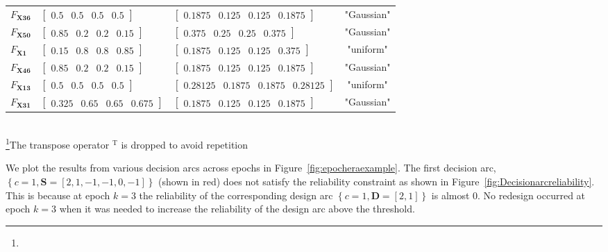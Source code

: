 \begin{table}[h!]
\begin{tabular}{l>{\centering\arraybackslash}p{4.2cm}>{\centering\arraybackslash}p{6cm}c}
	\hline
	$F_{\mathbf{X36}}$ & $\begin{bmatrix} 0.5 & 0.5 & 0.5 & 0.5 \end{bmatrix}$ & $\begin{bmatrix} 0.1875 & 0.125 & 0.125 & 0.1875 \end{bmatrix}$ & "Gaussian" \\
	$F_{\mathbf{X50}}$ & $\begin{bmatrix} 0.85 & 0.2 & 0.2 & 0.15 \end{bmatrix}$ & $\begin{bmatrix} 0.375 & 0.25 & 0.25 & 0.375 \end{bmatrix}$ & "Gaussian" \\
	$F_{\mathbf{X1}}$ & $\begin{bmatrix} 0.15 & 0.8 & 0.8 & 0.85 \end{bmatrix}$ & $\begin{bmatrix} 0.1875 & 0.125 & 0.125 & 0.375 \end{bmatrix}$ & "uniform" \\
	$F_{\mathbf{X46}}$ & $\begin{bmatrix} 0.85 & 0.2 & 0.2 & 0.15 \end{bmatrix}$ & $\begin{bmatrix} 0.1875 & 0.125 & 0.125 & 0.1875 \end{bmatrix}$ & "Gaussian" \\
	$F_{\mathbf{X13}}$ & $\begin{bmatrix} 0.5 & 0.5 & 0.5 & 0.5 \end{bmatrix}$ & $\begin{bmatrix} 0.28125 & 0.1875 & 0.1875 & 0.28125 \end{bmatrix}$ & "uniform" \\
	$F_{\mathbf{X31}}$ & $\begin{bmatrix} 0.325 & 0.65 & 0.65 & 0.675 \end{bmatrix}$ & $\begin{bmatrix} 0.1875 & 0.125 & 0.125 & 0.1875 \end{bmatrix}$ & "Gaussian" \\
	\hline\hline
	\end{tabular}\\
	\footnote[1]{}The transpose operator $^{\mathrm{T}}$ is dropped to avoid repetition
\end{table}

We plot the results from various decision arcs across epochs in Figure~\ref{fig:epocheraexample}. The first decision arc, $\left\{c=1,\mathbf{S}=\left[2,1,-1,-1,0,-1\right]\right\}$ (shown in red) does not satisfy the reliability constraint as shown in Figure~\ref{fig:Decisionarcreliability}. This is because at epoch $k=3$ the reliability of the corresponding design arc $\left\{c=1,\mathbf{D}=\left[2,1\right]\right\}$ is almost 0. No redesign occurred at epoch $k=3$ when it was needed to increase the reliability of the design arc above the threshold.

